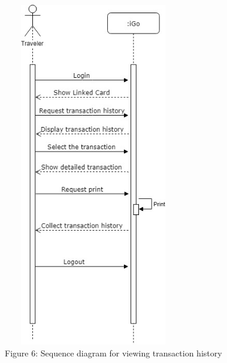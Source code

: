 \documentclass[a4paper, 11pt]{report}
\begin{document}
{\qquad\qquad\qquad\qquad
 \includegraphics[width=78mm,height=150mm,scale=0.5]
{Sequence_Transaction_History.jpg}\\
\tab \qquad \quad\qquad Figure 6: Sequence diagram for viewing transaction history
}
\end{document}

